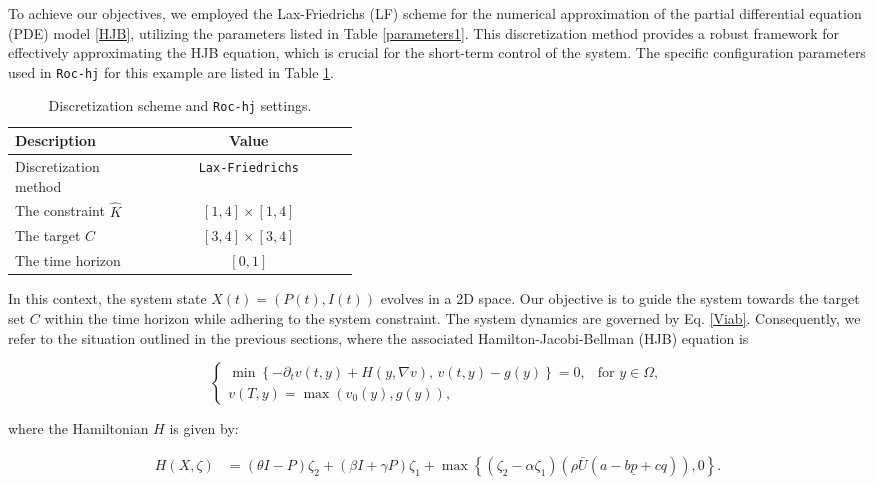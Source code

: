 \documentclass[]{interact}
\theoremstyle{plain}%
\theoremstyle{definition}
\theoremstyle{remark}
\begin{document}
To achieve our objectives, we employed the Lax-Friedrichs (LF) scheme for the numerical approximation of the partial differential equation (PDE) model \eqref{HJB}, utilizing the parameters listed in Table \ref{parameters1}. This discretization method provides a robust framework for effectively approximating the HJB equation, which is crucial for the short-term control of the system. 
The specific configuration parameters used in {\tt Roc-hj} for this example are listed in Table \ref{Tab.1}.

\begin{table}[htbp]
\centering
\caption{Discretization scheme and {\tt Roc-hj} settings.}
\label{Tab.1}
\begin{tabular}{p{0.4\linewidth}c}
\toprule
\textbf{Description} & \textbf{Value} \\
\midrule
Discretization method & {\tt Lax-Friedrichs} \\
The constraint \(\hat{K}\) & \([1, 4] \times [1, 4]\) \\
The target \(C\) & \([3, 4] \times [3, 4]\) \\
The time horizon & \([0, 1]\) \\
\bottomrule
\end{tabular}
\end{table}


In this context, the system state \( X(t) = (P(t), I(t)) \) evolves in a 2D space. Our objective is to guide the system towards the target set \( C \) within the time horizon while adhering to the system constraint.
The system dynamics are governed by Eq. \eqref{Viab}. Consequently, we refer to the situation outlined in the previous sections, where the associated Hamilton-Jacobi-Bellman (HJB) equation is


\begin{equation*} 
\begin{cases}
    \min \left\{ -\partial_{t} v(t,y) + H(y, \nabla v), \, v(t, y) - g(y) \right\} = 0, & \text{for } y \in \Omega, \\
    v(T,y) = \max(v_{0}(y), g(y)),
\end{cases}
\end{equation*}

where the Hamiltonian \( H \) is given by:

\begin{align*}
    H(X, \zeta) & = (\theta I - P) \zeta_2 + (\beta I + \gamma P) \zeta_1 + \max \left\{ \left( \zeta_2 - \alpha \zeta_1 \right) (\rho \bar{U} (a - b \underline{p} + cq)), 0 \right\}.
\end{align*}
\end{document}
